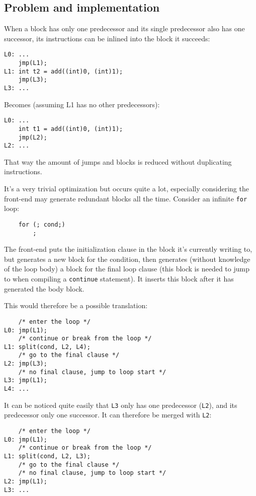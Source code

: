 \documentclass[12pt, a4paper]{article}
\begin{document}
\subsection{Problem and implementation}
When a block has only one predecessor and its single predecessor
also has one successor, its instructions can be inlined into the block it succeeds:

\begin{lstlisting}
L0:	...
	jmp(L1);
L1:	int t2 = add((int)0, (int)1);
	jmp(L3);
L3:	...
\end{lstlisting}

Becomes (assuming L1 has no other predecessors):

\begin{lstlisting}
L0:	...
	int t1 = add((int)0, (int)1);
	jmp(L2);
L2:	...
\end{lstlisting}

That way the amount of jumps and blocks is reduced without duplicating instructions.

It's a very trivial optimization but occurs quite a lot, especially considering
the front-end may generate redundant blocks all the time. Consider an infinite
\verb+for+ loop:

\begin{lstlisting}
	for (; cond;)
		;
\end{lstlisting}

The front-end puts the initialization clause in the block it's currently writing
to, but generates a new block for the condition, then generates (without knowledge
of the loop body) a block for the final loop clause (this block is needed to jump
to when compiling a \verb+continue+ statement). It inserts this block after
it has generated the body block.

This would therefore be a possible translation:

\begin{lstlisting}
	/* enter the loop */
L0:	jmp(L1);
	/* continue or break from the loop */
L1:	split(cond, L2, L4);
	/* go to the final clause */
L2:	jmp(L3);
	/* no final clause, jump to loop start */
L3:	jmp(L1);
L4:	...
\end{lstlisting}

It can be noticed quite easily that \verb+L3+ only has one predecessor (\verb+L2+), and its
predecessor only one successor. It can therefore be merged with \verb+L2+:

\begin{lstlisting}
	/* enter the loop */
L0:	jmp(L1);
	/* continue or break from the loop */
L1:	split(cond, L2, L3);
	/* go to the final clause */
	/* no final clause, jump to loop start */
L2:	jmp(L1);
L3:	...
\end{lstlisting}
\end{document}
